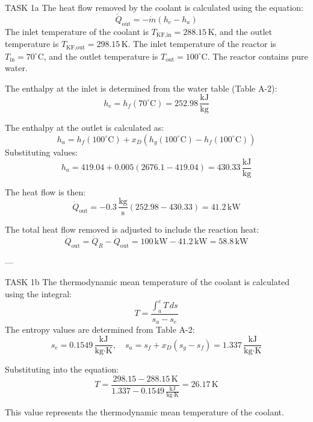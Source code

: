 TASK 1a  
The heat flow removed by the coolant is calculated using the equation:  
\[
\dot{Q}_{\text{out}} = -\dot{m} \left( h_e - h_a \right)
\]  
The inlet temperature of the coolant is \( T_{\text{KF,in}} = 288.15 \, \text{K} \), and the outlet temperature is \( T_{\text{KF,out}} = 298.15 \, \text{K} \). The inlet temperature of the reactor is \( T_{\text{in}} = 70^\circ\text{C} \), and the outlet temperature is \( T_{\text{out}} = 100^\circ\text{C} \). The reactor contains pure water.  

The enthalpy at the inlet is determined from the water table (Table A-2):  
\[
h_e = h_f(70^\circ\text{C}) = 252.98 \, \frac{\text{kJ}}{\text{kg}}
\]  

The enthalpy at the outlet is calculated as:  
\[
h_a = h_f(100^\circ\text{C}) + x_D \left( h_g(100^\circ\text{C}) - h_f(100^\circ\text{C}) \right)
\]  
Substituting values:  
\[
h_a = 419.04 + 0.005 \left( 2676.1 - 419.04 \right) = 430.33 \, \frac{\text{kJ}}{\text{kg}}
\]  

The heat flow is then:  
\[
\dot{Q}_{\text{out}} = -0.3 \, \frac{\text{kg}}{\text{s}} \left( 252.98 - 430.33 \right) = 41.2 \, \text{kW}
\]  

The total heat flow removed is adjusted to include the reaction heat:  
\[
\dot{Q}_{\text{out}} = \dot{Q}_R - \dot{Q}_{\text{out}} = 100 \, \text{kW} - 41.2 \, \text{kW} = 58.8 \, \text{kW}
\]  

---

TASK 1b  
The thermodynamic mean temperature of the coolant is calculated using the integral:  
\[
T = \frac{\int_a^e T \, ds}{s_a - s_e}
\]  
The entropy values are determined from Table A-2:  
\[
s_e = 0.1549 \, \frac{\text{kJ}}{\text{kg·K}}, \quad s_a = s_f + x_D \left( s_g - s_f \right) = 1.337 \, \frac{\text{kJ}}{\text{kg·K}}
\]  

Substituting into the equation:  
\[
T = \frac{298.15 - 288.15 \, \text{K}}{1.337 - 0.1549 \, \frac{\text{kJ}}{\text{kg·K}}} = 26.17 \, \text{K}
\]  

This value represents the thermodynamic mean temperature of the coolant.